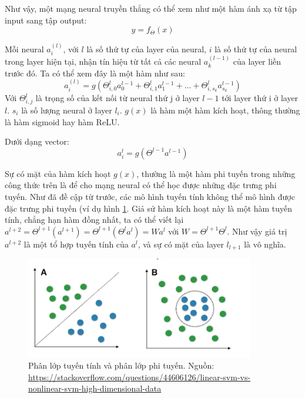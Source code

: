 Như vậy, một mạng neural truyền thẳng có thể xem như một hàm ánh xạ từ tập input sang tập output: $$y = f_{\Theta}(x) $$

Mỗi neural $a_{i}^{(l)}$, với $l$ là số thứ tự của layer của neural, $i$ là số thứ tự của neural trong layer hiện tại, nhận tín hiệu từ tất cả các neural $a_{k}^{(l-1)}$ của layer liền trước đó. Ta có thể xem đây là một hàm như sau: $$ a_{i}^{(l)} = g(\Theta^{l}_{i,0} a_{0}^{l-1} +  \Theta^{l}_{i,1}a_{1}^{l-1} + ... + \Theta^{l}_{i,s_{k}}a_{s_{k}}^{l-1})  $$
Với $\Theta^{l}_{i,j}$ là trọng số của kết nối từ neural thứ j ở layer $l-1$ tới layer thứ i ở layer $l$. $s_{i}$ là số lượng neural ở layer $l_{i}$. $g(x)$ là hàm một hàm kích hoạt, thông thường là hàm sigmoid hay hàm ReLU.

Dưới dạng vector: $$  a_{i}^{l} =  g( \Theta^{l-1}a^{l-1} ) $$ 

Sự có mặt của hàm kích hoạt $g(x)$, thường là một hàm phi tuyến trong những công thức trên là để cho mạng neural có thể học được những đặc trưng phi tuyến. Như đã đề cập từ trước, các mô hình tuyến tính không thể mô hình được đặc trưng phi tuyến (ví dụ hình \ref{fig:linear_nonlinear_data}. Giả sử hàm kích hoạt này là một hàm tuyến tính, chẳng hạn hàm đồng nhất, ta có thể viết lại $ a^{l+2} = \Theta^{l+1}(a^{l+1}) =\Theta^{l+1}(\Theta^{l}a^{l}) = Wa^{l}$ với $W = \Theta^{l+1}\Theta^{l}$. Như vậy giá trị $a^{l+2}$ là một tổ hợp tuyến tính của $a^{l}$, và sự có mặt của layer $l_{l+1}$ là vô nghĩa.


\begin{figure}[htp]
\centering
\includegraphics[width=10cm]{resources/chapter2_linear_nonlinear_data.png}
\caption[Phân lớp tuyến tính và phân lớp phi tuyến]{Phân lớp tuyến tính và phân lớp phi tuyến. \footnotesize{Nguồn: \url{https://stackoverflow.com/questions/44606126/linear-svm-vs-nonlinear-svm-high-dimensional-data}}}
\label{fig:linear_nonlinear_data}
\end{figure}



